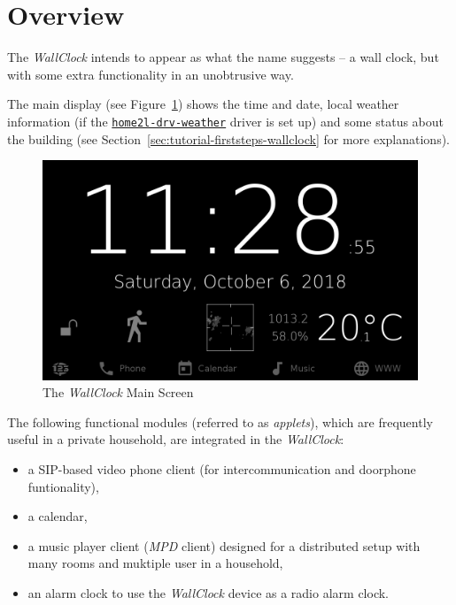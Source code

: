 \documentclass[12pt,english,parskip=half]{scrreprt}
\newcommand{\idx}[1]{#1\index{#1}}
\newcommand{\toolref}[1]{\hyperref[tool:#1]{\texttt{\idx{#1}}}}
\begin{document}
\section{Overview}
\label{sec:wallclock-overview}


The \emph{WallClock} intends to appear as what the name suggests -- a
wall clock, but with some extra functionality in an unobtrusive way.

The main display (see Figure~\ref{fig:screen-wallclock-home})
shows the time and date, local weather information (if the \toolref{home2l-drv-weather} driver is set
up) and some status about the building (see Section~\ref{sec:tutorial-firststeps-wallclock} for more
explanations).


\begin{figure}[ht]
  \centering
  \includegraphics[width=0.7\linewidth]{figs/screen-wallclock-home.png}
  \caption[l]{The \emph{WallClock} Main Screen}
  \label{fig:screen-wallclock-home}
\end{figure}


The following functional modules
(referred to as \emph{applets}), which are frequently useful in a
private household, are integrated in the \emph{WallClock}:

\begin{itemize}
\item
  a SIP-based video phone client (for intercommunication and doorphone funtionality),
\item
  a calendar,
\item
  a music player client (\emph{MPD} client) designed for a distributed
  setup with many rooms and muktiple user in a household,
\item
  an alarm clock to use the \emph{WallClock} device as a radio alarm clock.
\end{itemize}
\end{document}
